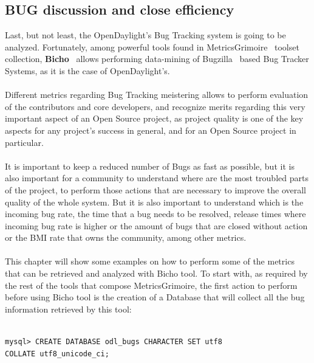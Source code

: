 \documentclass[a4paper, 12pt]{book}
\begin{document}
\subsection{BUG discussion and close efficiency}
Last, but not least, the OpenDaylight's Bug Tracking system is going to be analyzed. Fortunately, among powerful tools found in MetricsGrimoire~\cite{MetricsGrimore} toolset collection, \textbf{Bicho}~\cite{Bicho} allows performing data-mining of Bugzilla~\cite{Bugzilla} based Bug Tracker Systems, as it is the case of OpenDaylight's.\\
\\
Different metrics regarding Bug Tracking meistering allows to perform evaluation of the contributors and core developers, and recognize merits regarding this very important aspect of an Open Source project, as project quality is one of the key aspects for any project's success in general, and for an Open Source project in particular.\\
\\
It is important to keep a reduced number of Bugs as fast as possible, but it is also important for a community to understand where are the most troubled parts of the project, to perform those actions that are necessary to improve the overall quality of the whole system. But it is also important to understand which is the incoming bug rate, the time that a bug needs to be resolved, release times where incoming bug rate is higher or the amount of bugs that are closed without action or the BMI rate that owns the community, among other metrics.\\
\\
This chapter will show some examples on how to perform some of the metrics that can be retrieved and analyzed with Bicho tool. To start with, as required by the rest of the tools that compose MetricsGrimoire, the first action to perform before using Bicho tool is the creation of a Database that will collect all the bug information retrieved by this tool:
\begin{verbatim}

mysql> CREATE DATABASE odl_bugs CHARACTER SET utf8
COLLATE utf8_unicode_ci;

\end{verbatim}
\end{document}
